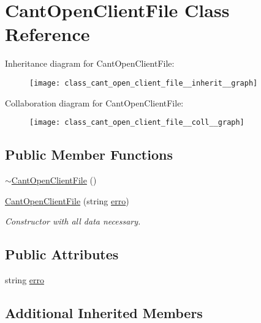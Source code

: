 \hypertarget{class_cant_open_client_file}{}\section{Cant\+Open\+Client\+File Class Reference}
\label{class_cant_open_client_file}


Inheritance diagram for Cant\+Open\+Client\+File\+:\nopagebreak
\begin{figure}[H]
\begin{center}
\leavevmode
\texttt{[image: class\_cant\_open\_client\_file\_\_inherit\_\_graph]}
\end{center}
\end{figure}


Collaboration diagram for Cant\+Open\+Client\+File\+:\nopagebreak
\begin{figure}[H]
\begin{center}
\leavevmode
\texttt{[image: class\_cant\_open\_client\_file\_\_coll\_\_graph]}
\end{center}
\end{figure}
\subsection*{Public Member Functions}
\begin{DoxyCompactItemize}
\item 
\hyperlink{class_cant_open_client_file_a2185647136543071c3c98199486caf36}{$\sim$\+Cant\+Open\+Client\+File} ()
\item 
\hyperlink{class_cant_open_client_file_a6190eccfaac3cb2f65f3cfd000ed5fb6}{Cant\+Open\+Client\+File} (string \hyperlink{class_cant_open_client_file_aa4aa82cf39a9e960a76d32da6d379b05}{erro})
\begin{DoxyCompactList}\small\item\em Constructor with all data necessary. \end{DoxyCompactList}\end{DoxyCompactItemize}
\subsection*{Public Attributes}
\begin{DoxyCompactItemize}
\item 
string \hyperlink{class_cant_open_client_file_aa4aa82cf39a9e960a76d32da6d379b05}{erro}
\end{DoxyCompactItemize}
\subsection*{Additional Inherited Members}


